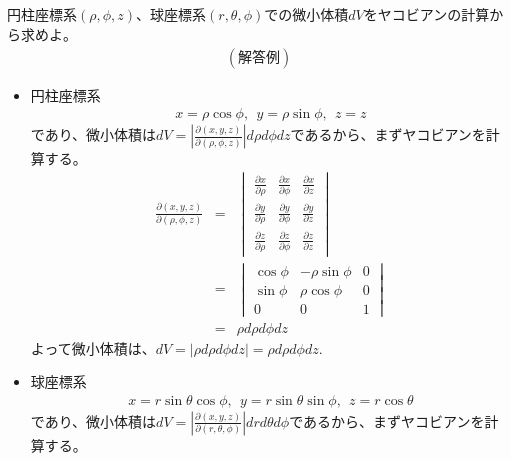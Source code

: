\documentclass[a4paper,11pt,fleqn]{jarticle}
\begin{document}
\subsection{}
円柱座標系$(\rho ,\phi ,z)$、球座標系$(r,\theta ,\phi)$での微小体積$dV$をヤコビアンの計算から求めよ。
\begin{eqnarray*}
(解答例)
\end{eqnarray*}
\begin{itemize}
\item 円柱座標系
\begin{eqnarray*}
x=\rho\cos\phi ,~~y=\rho\sin\phi ,~~z=z
\end{eqnarray*}
であり、微小体積は$dV=\left| \frac{\partial (x,y,z)}{\partial (\rho ,\phi ,z)}\right| d\rho d\phi dz$であるから、まずヤコビアンを計算する。
\begin{eqnarray*}
\frac{\partial (x, y, z)}{\partial (\rho , \phi , z)}&=&
\begin{vmatrix}
\frac{\partial x}{\partial \rho}  &\frac{\partial x}{\partial \phi}  &\frac{\partial x}{\partial z} \\
\frac{\partial y}{\partial \rho}  &\frac{\partial y}{\partial \phi}  &\frac{\partial y}{\partial z} \\
\frac{\partial z}{\partial \rho}  &\frac{\partial z}{\partial \phi}  &\frac{\partial z}{\partial z}
\end{vmatrix}
\\&=&
\begin{vmatrix}
\cos\phi &-\rho\sin\phi &0 \\
\sin\phi &\rho\cos\phi &0 \\
0 &0 &1
\end{vmatrix}
\\&=&\rho d\rho d\phi dz
\end{eqnarray*}
よって微小体積は、$dV=|\rho d\rho d\phi dz|=\rho d\rho d\phi dz$.

\item 球座標系
\begin{eqnarray*}
x=r\sin\theta\cos\phi ,~~y=r\sin\theta\sin\phi ,~~z=r\cos\theta
\end{eqnarray*}
であり、微小体積は$dV=\left| \frac{\partial (x,y,z)}{\partial (r ,\theta ,\phi )}\right| dr d\theta d\phi$であるから、まずヤコビアンを計算する。


\end{itemize}
\end{document}
